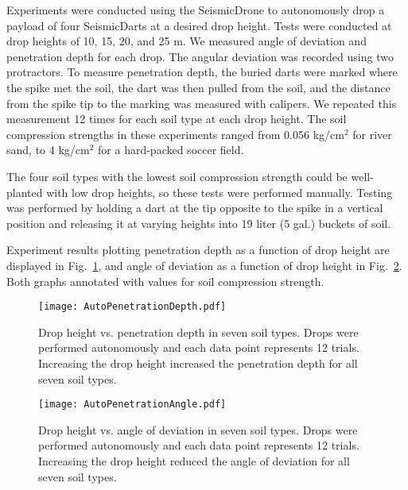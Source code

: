 Experiments were conducted using the SeismicDrone to autonomously drop a payload of four SeismicDarts at a desired drop height. 
 Tests were conducted at drop heights of 10, 15, 20, and 25 m. 
 We measured angle of deviation and penetration depth for each drop.
 The angular deviation was recorded using two protractors.
 To measure penetration depth, the buried darts were marked where the spike met the soil, the dart was then pulled from the soil, and the distance from the spike tip to the marking was measured with calipers. 
  We repeated this measurement 12 times for each soil type at each drop height.  The soil compression strengths in these experiments ranged from 0.056 kg/cm$^2$ for river sand, to 4 kg/cm$^2$ for a hard-packed soccer field.

The four soil types with the lowest soil compression strength could be well-planted with low drop heights, so these tests were performed manually.
   Testing was performed by holding a dart at the tip opposite to the spike in a vertical position and releasing it at varying heights into 19 liter (5 gal.) buckets of soil. 


 
Experiment results plotting penetration depth as a function of drop height are displayed in Fig.~\ref{fig:DepthPlotIndoors}, and angle of deviation as a function of drop height in Fig.~\ref{fig:AnglePlotIndoors}.   Both graphs annotated with values for soil compression strength. 

\begin{figure} \centering
{\texttt{[image: AutoPenetrationDepth.pdf]}}
\caption{Drop height vs. penetration depth in seven soil types. Drops were performed autonomously and each data point represents 12 trials. Increasing the drop height increased the penetration depth for all seven soil types.} 
\label{fig:DepthPlotIndoors}
\end{figure}

\begin{figure} \centering
{\texttt{[image: AutoPenetrationAngle.pdf]}}
\caption{Drop height vs. angle of deviation in seven soil types. Drops were performed autonomously and each data point represents 12 trials. Increasing the drop height reduced the angle of deviation for all seven soil types.} 
\label{fig:AnglePlotIndoors}
\vspace{-1em}
\end{figure}

